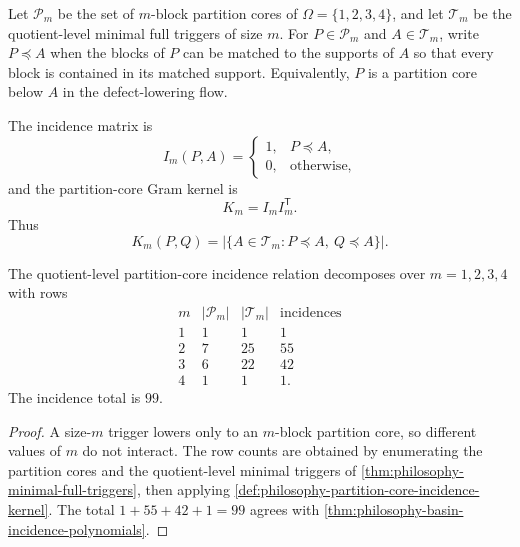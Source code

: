 \begin{definition}
\label{def:philosophy-partition-core-incidence-kernel}
Let $\mathcal{P}_{m}$ be the set of $m$-block partition cores of
$\Omega=\{1,2,3,4\}$, and let $\mathcal{T}_{m}$ be the quotient-level
minimal full triggers of size $m$. For $P\in\mathcal{P}_{m}$ and
$A\in\mathcal{T}_{m}$, write $P\preceq A$ when the blocks of $P$ can be
matched to the supports of $A$ so that every block is contained in its
matched support. Equivalently, $P$ is a partition core below $A$ in the
defect-lowering flow.

The incidence matrix is
$$
  I_{m}(P,A)
  =
  \begin{cases}
    1,&P\preceq A,\\
    0,&\text{otherwise},
  \end{cases}
$$
and the partition-core Gram kernel is
$$
  K_{m}=I_{m}I_{m}^{\mathsf T}.
$$
Thus
$$
  K_{m}(P,Q)
  =
  |\{A\in\mathcal{T}_{m}:P\preceq A,\ Q\preceq A\}|.
$$
\end{definition}

\begin{theorem}
\label{thm:philosophy-partition-core-kernel-size-decomposition}
The quotient-level partition-core incidence relation decomposes over
$m=1,2,3,4$ with rows
$$
\begin{array}{c|r|r|r}
  m & |\mathcal{P}_{m}| & |\mathcal{T}_{m}| & \text{incidences}\\
  \hline
  1 & 1 & 1 & 1\\
  2 & 7 & 25 & 55\\
  3 & 6 & 22 & 42\\
  4 & 1 & 1 & 1.
\end{array}
$$
The incidence total is $99$.
\end{theorem}
\begin{proof}
A size-$m$ trigger lowers only to an $m$-block partition core, so different
values of $m$ do not interact. The row counts are obtained by enumerating
the partition cores and the quotient-level minimal triggers of
\autoref{thm:philosophy-minimal-full-triggers}, then applying
\autoref{def:philosophy-partition-core-incidence-kernel}. The total
$1+55+42+1=99$ agrees with
\autoref{thm:philosophy-basin-incidence-polynomials}.
\end{proof}

